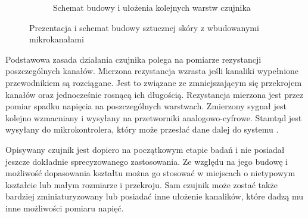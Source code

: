 \begin{figure}[!h]
\begin{subfigure}[t]{0.495\linewidth}
    \caption{Schemat budowy i ułożenia kolejnych warstw czujnika} 
  \end{subfigure}
  \centering
  \caption{Prezentacja i schemat budowy sztucznej skóry z wbudowanymi mikrokanałami \cite{b_article_tactile_precise}}
  \label{f_przeglad_prezyzyjna}
\end{figure}

Podstawowa zasada działania czujnika polega na pomiarze rezystancji poszczególnych kanałów. Mierzona rezystancja wzrasta jeśli kanaliki wypełnione przewodnikiem są rozciągane. Jest to związane ze zmniejszającym się przekrojem kanałów oraz jednocześnie rosnącą ich długością. 
Rezystancja mierzona jest przez pomiar spadku napięcia na poszczególnych warstwach. Zmierzony sygnał jest kolejno wzmacniany i wysyłany na przetworniki analogowo-cyfrowe. Stamtąd jest wysyłany do mikrokontrolera, który może przesłać dane dalej do systemu \cite{b_article_tactile_precise}.

Opisywany czujnik jest dopiero na początkowym etapie badań i nie posiadał jeszcze dokładnie sprecyzowanego zastosowania. Ze względu na jego budowę i możliwość dopasowania kształtu można go stosować w miejscach o nietypowym kształcie lub małym rozmiarze i przekroju. Sam czujnik może zostać także bardziej zminiaturyzowany lub posiadać inne ułożenie kanalików, które dadzą mu inne możliwości pomiaru napięć.
